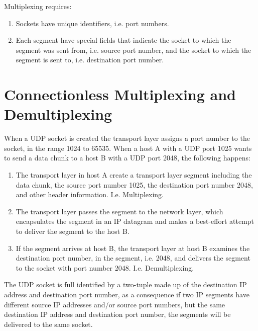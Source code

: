 \documentclass[12pt letter]{report}
\begin{document}


Multiplexing requires:
\begin{enumerate}
  \item Sockets have unique identifiers, i.e. port numbers.
  \item Each segment have special fields that indicate the socket to
    which the segment was sent from, i.e. source port number, and the
    socket to which the segment is sent to, i.e. destination port number.
\end{enumerate}

\section{Connectionless Multiplexing and Demultiplexing}

When a UDP socket is created the transport layer assigns a port
number to the socket, in the range 1024 to 65535.  When a host A with
a UDP port 1025 wants to send a data chunk to a host B with a UDP
port 2048, the following happens:
\begin{enumerate}
  \item The transport layer in host A create a transport layer
    segment including the data chunk, the source port number 1025,
    the destination port number 2048, and other header information.
    I.e. Multiplexing.
  \item The transport layer passes the segment to the network layer,
    which encapsulates the segment in an IP datagram and makes a
    best-effort attempt to deliver the segment to the host B.
  \item If the segment arrives at host B, the transport layer at host
    B examines the destination port number, in the segment, i.e.
    2048, and delivers the segment to the socket with port number
    2048. I.e. Demultiplexing.
\end{enumerate}

The UDP socket is full identified by a two-tuple made up of the
destination IP address and destination port number, as a consequence
if two IP segments have different source IP addresses and/or source
port numbers, but the same destination IP address and destination
port number, the segments will be delivered to the same socket.
\end{document}
